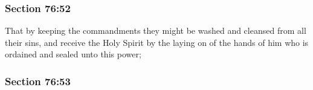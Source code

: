
	\subsubsection{Section 76:52} %
		\label{DC76-52}

		That by keeping the commandments they might be washed and cleansed from all their sins, and receive the Holy Spirit by the laying on of the hands of him who is ordained and sealed unto this power;


	\subsubsection{Section 76:53} %
		\label{DC76-53}

